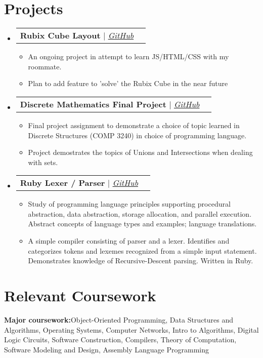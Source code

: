 \documentclass[letterpaper,11pt]{article}
\makeatletter
\newcommand{\resumeItem}[1]{
  \item\small{
    {#1 \vspace{-2pt}}
  }
}
\newcommand{\resumeProjectHeading}[2]{
    \vspace{-2pt}\item
    \begin{tabular*}{0.97\textwidth}{l@{\extracolsep{\fill}}r}
      \small#1 & #2 \\
    \end{tabular*}\vspace{-7pt}
}
\newcommand{\resumeSubHeadingListStart}{\begin{itemize}[leftmargin=0.15in, label={}]}
\newcommand{\resumeSubHeadingListEnd}{\end{itemize}}
\newcommand{\resumeItemListStart}{\begin{itemize}}
\newcommand{\resumeItemListEnd}{\end{itemize}\vspace{-5pt}}
\makeatother
\begin{document}

\section{Projects}
    \vspace{3pt}
    \resumeSubHeadingListStart
      
      \resumeProjectHeading
        {\textbf{Rubix Cube Layout} $|$ \emph{\href{https://github.com/Maxm326/Rubix-Cube-Layout}{\color{blue}GitHub}}}{}
          \resumeItemListStart
            \resumeItem{An ongoing project in attempt to learn JS/HTML/CSS with my roommate.}
            \resumeItem{ Plan to add feature to 'solve' the Rubix Cube in the near future}
          \resumeItemListEnd
        
      \resumeProjectHeading
        {\textbf{Discrete Mathematics Final Project} $|$ \emph{\href{https://github.com/noahjonesx/COMP3240--DiscreteStructures}{\color{blue}GitHub}}}{}
          \resumeItemListStart
            \resumeItem{Final project assignment to demonstrate a choice of topic learned in Discrete Structures (COMP 3240) in choice of programming language.}
            \resumeItem{Project demostrates the topics of Unions and Intersections when dealing with sets.}
          \resumeItemListEnd

      \resumeProjectHeading
        {\textbf{Ruby Lexer / Parser} $|$ \emph{\href{https://github.com/noahjonesx/COMP3220--Principles-of-Programming-Languages/tree/main/M2}{\color{blue}GitHub}}}{}
          \resumeItemListStart
            \resumeItem{Study of programming language principles supporting procedural abstraction, data abstraction, storage allocation, and parallel execution. Abstract concepts of language types and examples; language translations.}
            \resumeItem{A simple compiler consisting of parser and a lexer. Identifies and categorizes tokens and lexemes recognized from a simple input statement. Demonstrates knowledge of Recursive-Descent parsing. Written in Ruby.}
          \resumeItemListEnd
      
    \resumeSubHeadingListEnd




 \section{Relevant Coursework}
   \vspace{2pt}
   \resumeSubHeadingListStart
     \small{\item{
         \textbf{Major coursework:}{Object-Oriented Programming, Data Structures and Algorithms, Operating Systems, Computer Networks, Intro to Algorithms, Digital Logic Circuits, Software Construction, Compilers, Theory of Computation, Software Modeling and Design, Assembly Language Programming} \\ \vspace{3pt}
     }}
   \resumeSubHeadingListEnd
\end{document}
